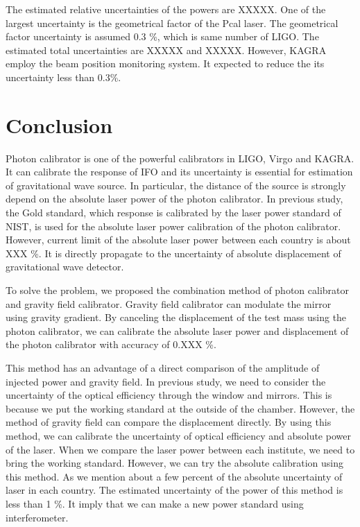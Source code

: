 \documentclass[A4]{spie}  %
\begin{document}
The estimated relative uncertainties of the powers are XXXXX. One of the largest uncertainty is the geometrical factor of the Pcal laser. The geometrical factor uncertainty is assumed 0.3 \%, which is same number of LIGO. The estimated total uncertainties are XXXXX and XXXXX. However, KAGRA employ the beam position monitoring system. It expected to reduce the its uncertainty less than 0.3\%. 


\section{Conclusion}
Photon calibrator is one of the powerful calibrators in LIGO, Virgo and KAGRA. It can calibrate the response of IFO and its uncertainty is essential for estimation of gravitational wave source. In particular, the distance of the source is strongly depend on the absolute laser power of the photon calibrator. In previous study, the Gold standard, which response is calibrated by the laser power standard of NIST, is used for the absolute laser power calibration of the photon calibrator. However, current limit of the absolute laser power between each country is about XXX \%. It is directly propagate to the uncertainty of absolute displacement of gravitational wave detector.

To solve the problem, we proposed the combination method of photon calibrator and gravity field calibrator. Gravity field calibrator can modulate the mirror using gravity gradient. By canceling the displacement of the test mass using the photon calibrator, we can calibrate the absolute laser power and displacement of the photon calibrator with accuracy of 0.XXX \%.

This method has an advantage of a direct comparison of the amplitude of injected power and gravity field. In previous study, we need to consider the uncertainty of the optical efficiency through the window and mirrors. This is because we put the working standard at the outside of the chamber. However, the method of gravity field can compare the displacement directly. By using this method, we can calibrate the uncertainty of optical efficiency and absolute power of the laser. When we compare the laser power between each institute, we need to bring the working standard. However, we can try the absolute calibration using this method. As we mention about a few percent of the absolute uncertainty of laser in each country. The estimated uncertainty of the power of this method is less than 1 \%. It imply that we can make a new power standard using interferometer.
\acknowledgments     %
 
\end{document}
